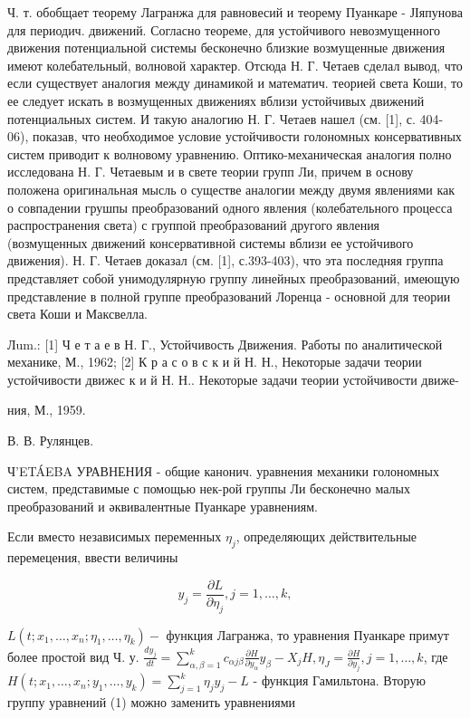 \documentclass[10pt]{article}
\begin{document}
Ч. т. обобщает теорему Лагранжа для равновесий и теорему Пуанкаре - ЈІяпунова для периодич. движений. Согласно теореме, для устойчивого невозмущенного движения потенциальной системы бесконечно близкие возмущенные движения имеют колебательный, волновой характер. Отсюда Н. Г. Четаев сделал вывод, что если существует аналогия между динамикой и математич. теорией света Коши, то ее следует искать в возмущенных движениях вблизи устойчивых движений потенциальных систем. И такую аналогию Н. Г. Четаев нашел (см. [1], с. 404-06), показав, что необходимое условие устойчивости голономных консервативных систем приводит к волновому уравнению. Оптико-механическая аналогия полно исследована Н. Г. Четаевым и в свете теории групп Ли, причем в основу положена оригинальная мысль о существе аналогии между двумя явлениями как о совпадении грушпы преобразований одного явления (колебательного процесса распространения света) с группой преобразований другого явления (возмущенных движений консервативной системы вблизи ее устойчивого движения). Н. Г. Четаев доказал (см. [1], с.393-403), что эта последняя группа представляет собой унимодулярную группу линейных преобразований, имеющую представление в полной группе преобразований Лоренца - основной для теории света Коши и Максвелла.



Лum.: [1] Ч е т а е в Н. Г., Устойчивость Движения. Работы по аналитической механике, М., 1962; [2] К р а с о в с к и й Н. Н., Некоторые задачи теории устойчивости движес к и й Н. Н.. Некоторые задачи теории устойчивости движе-

ния, М., 1959.

В. В. Рулянцев.



Ч'ETÁEBA УРАВНЕНИЯ - общие канонич. уравнения механики голономных систем, представимые с помощью нек-рой группы Ли бесконечно малых преобразований и әквивалентные Пуанкаре уравнениям.



Если вместо независимых переменных $\eta_{j}$, определяющих действительные перемецения, ввести величины



\[

y_{j}=\frac{\partial L}{\partial \eta_{j}}, j=1, \ldots, k,

\]



$L\left(t ; x_{1}, \ldots, x_{n} ; \eta_{1}, \ldots, \eta_{k}\right)-$ функция Лагранжа, то уравнения Пуанкаре примут более простой вид Ч. у. $\frac{d y_{j}}{d t}=\sum_{\alpha, \beta=1}^{k} c_{\alpha j \beta} \frac{\partial H}{\partial y_{\alpha}} y_{\beta}-X_{j} H, \eta_{J}=\frac{\partial H}{\partial y_{j}}, j=1, \ldots, k$, где $H\left(t ; x_{1}, \ldots, x_{n} ; y_{1}, \ldots, y_{k}\right)=\sum_{j=1}^{k} \eta_{j} y_{j}-L$ - функция Гамильтона. Вторую группу уравнений (1) можно заменить уравнениями
\end{document}
